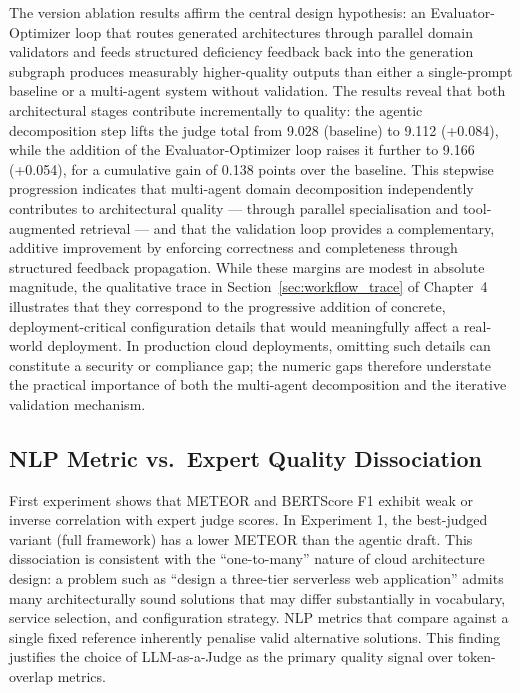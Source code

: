 The version ablation results affirm the central design hypothesis: an Evaluator-Optimizer loop that routes generated architectures through parallel domain validators and feeds structured deficiency feedback back into the generation subgraph produces measurably higher-quality outputs than either a single-prompt baseline or a multi-agent system without validation. The results reveal that both architectural stages contribute incrementally to quality: the agentic decomposition step lifts the judge total from 9.028 (baseline) to 9.112 (+0.084), while the addition of the Evaluator-Optimizer loop raises it further to 9.166 (+0.054), for a cumulative gain of 0.138 points over the baseline. This stepwise progression indicates that multi-agent domain decomposition independently contributes to architectural quality — through parallel specialisation and tool-augmented retrieval — and that the validation loop provides a complementary, additive improvement by enforcing correctness and completeness through structured feedback propagation. While these margins are modest in absolute magnitude, the qualitative trace in Section~\ref{sec:workflow_trace} of Chapter~4 illustrates that they correspond to the progressive addition of concrete, deployment-critical configuration details that would meaningfully affect a real-world deployment. In production cloud deployments, omitting such details can constitute a security or compliance gap; the numeric gaps therefore understate the practical importance of both the multi-agent decomposition and the iterative validation mechanism. 

\subsection{NLP Metric vs.\ Expert Quality Dissociation}

First experiment shows that METEOR and BERTScore F1 exhibit weak or inverse correlation with expert judge scores. In Experiment 1, the best-judged variant (full framework) has a lower METEOR than the agentic draft. This dissociation is consistent with the ``one-to-many'' nature of cloud architecture design: a problem such as ``design a three-tier serverless web application'' admits many architecturally sound solutions that may differ substantially in vocabulary, service selection, and configuration strategy. NLP metrics that compare against a single fixed reference inherently penalise valid alternative solutions. This finding justifies the choice of LLM-as-a-Judge as the primary quality signal over token-overlap metrics.

